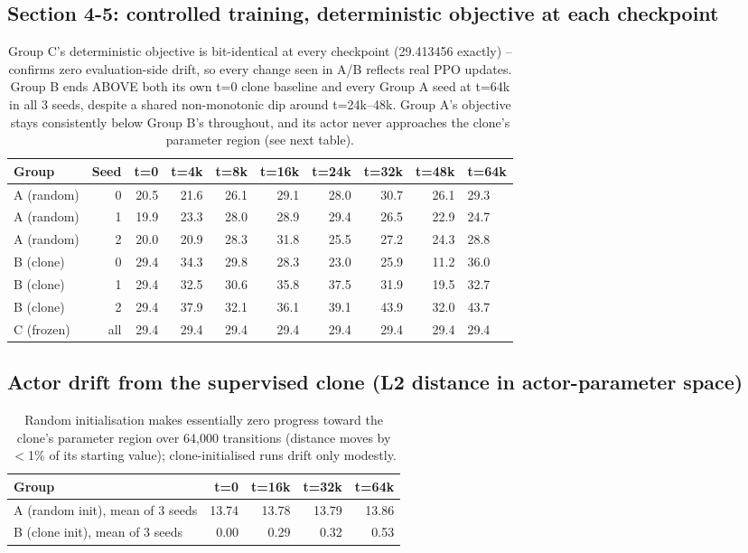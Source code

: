 \subsection*{Section 4-5: controlled training, deterministic objective at each checkpoint}
\begin{table}[h]
\centering
\small
\begin{tabular}{lrrrrrrrr}
\hline
Group & Seed & t=0 & t=4k & t=8k & t=16k & t=24k & t=32k & t=48k & t=64k \\
\hline
A (random) & 0 & 20.5 & 21.6 & 26.1 & 29.1 & 28.0 & 30.7 & 26.1 & 29.3 \\
A (random) & 1 & 19.9 & 23.3 & 28.0 & 28.9 & 29.4 & 26.5 & 22.9 & 24.7 \\
A (random) & 2 & 20.0 & 20.9 & 28.3 & 31.8 & 25.5 & 27.2 & 24.3 & 28.8 \\
B (clone)  & 0 & 29.4 & 34.3 & 29.8 & 28.3 & 23.0 & 25.9 & 11.2 & 36.0 \\
B (clone)  & 1 & 29.4 & 32.5 & 30.6 & 35.8 & 37.5 & 31.9 & 19.5 & 32.7 \\
B (clone)  & 2 & 29.4 & 37.9 & 32.1 & 36.1 & 39.1 & 43.9 & 32.0 & 43.7 \\
C (frozen) & all & 29.4 & 29.4 & 29.4 & 29.4 & 29.4 & 29.4 & 29.4 & 29.4 \\
\hline
\end{tabular}
\caption{Group C's deterministic objective is bit-identical at every
checkpoint (29.413456 exactly) -- confirms zero evaluation-side drift, so
every change seen in A/B reflects real PPO updates. Group B ends ABOVE both
its own t=0 clone baseline and every Group A seed at t=64k in all 3 seeds,
despite a shared non-monotonic dip around t=24k--48k. Group A's objective
stays consistently below Group B's throughout, and its actor never
approaches the clone's parameter region (see next table).}
\end{table}

\subsection*{Actor drift from the supervised clone (L2 distance in actor-parameter space)}
\begin{table}[h]
\centering
\begin{tabular}{lrrrr}
\hline
Group & t=0 & t=16k & t=32k & t=64k \\
\hline
A (random init), mean of 3 seeds & 13.74 & 13.78 & 13.79 & 13.86 \\
B (clone init), mean of 3 seeds  & 0.00  & 0.29  & 0.32  & 0.53  \\
\hline
\end{tabular}
\caption{Random initialisation makes essentially zero progress toward the
clone's parameter region over 64,000 transitions (distance moves by
$<$1\% of its starting value); clone-initialised runs drift only modestly.}
\end{table}

